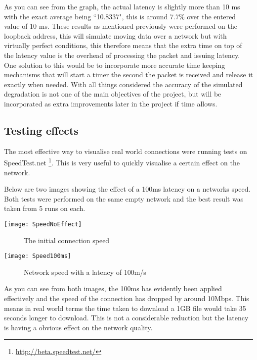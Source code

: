 As you can see from the graph, the actual latency is slightly more than 10 ms with the exact average being ``10.8337", this is around 7.7\% over the entered value of 10 ms. 
These results as mentioned previously were performed on the loopback address, this will simulate moving data over a network but with virtually perfect conditions, this therefore means that the extra time on top of the latency value is the overhead of processing the packet and issuing latency. One solution to this would be to incorporate more accurate time keeping mechanisms that will start a timer the second the packet is received and release it exactly when needed. With all things considered the accuracy of the simulated degradation is not one of the main objectives of the project, but will be incorporated as extra improvements later in the project if time allows.

\subsection{Testing effects}
The most effective way to visualise real world connections were running tests on SpeedTest.net \footnote{\url{http://beta.speedtest.net/}}. This is very useful to quickly visualise a certain effect on the network.

Below are two images showing the effect of a 100ms latency on a networks speed. Both tests were performed on the same empty network and the best result was taken from 5 runs on each.

\begin{center}
	\texttt{[image: SpeedNoEffect]}
	\begin{figure}[h]
		\caption{The initial connection speed}
	\end{figure}
\end{center}

\begin{center}
	\texttt{[image: Speed100ms]}
	\begin{figure}[h]
		\caption{Network speed with a latency of 100m/s}
	\end{figure}
\end{center}

As you can see from both images, the 100ms has evidently been applied effectively and the speed of the connection has dropped by around 10Mbps. This means in real world terms the time taken to download a 1GB file would take 35 seconds longer to download. This is not a considerable reduction but the latency is having a obvious effect on the network quality.

